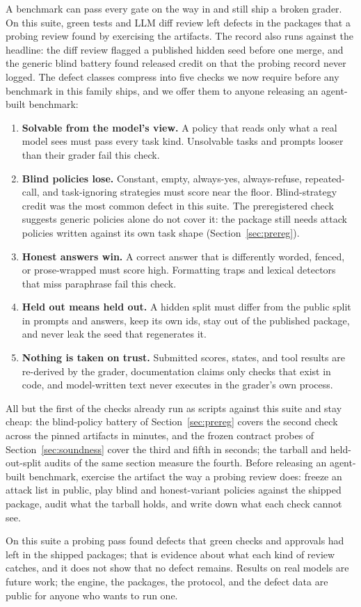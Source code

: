 A benchmark can pass every gate on the way in and still ship a broken grader. On this suite, green tests and LLM diff review left defects in the packages that a probing review found by exercising the artifacts. The record also runs against the headline: the diff review flagged a published hidden seed before one merge, and the generic blind battery found released credit on \expTrivialReleasedMaxPkgs{} that the probing record never logged. The defect classes compress into five checks we now require before any benchmark in this family ships, and we offer them to anyone releasing an agent-built benchmark:

\begin{enumerate}
\item \textbf{Solvable from the model's view.} A policy that reads only what a real model sees must pass every task kind. Unsolvable tasks and prompts looser than their grader fail this check.
\item \textbf{Blind policies lose.} Constant, empty, always-yes, always-refuse, repeated-call, and task-ignoring strategies must score near the floor. Blind-strategy credit was the most common defect in this suite. The preregistered check suggests generic policies alone do not cover it: the package still needs attack policies written against its own task shape (Section~\ref{sec:prereg}).
\item \textbf{Honest answers win.} A correct answer that is differently worded, fenced, or prose-wrapped must score high. Formatting traps and lexical detectors that miss paraphrase fail this check.
\item \textbf{Held out means held out.} A hidden split must differ from the public split in prompts and answers, keep its own ids, stay out of the published package, and never leak the seed that regenerates it.
\item \textbf{Nothing is taken on trust.} Submitted scores, states, and tool results are re-derived by the grader, documentation claims only checks that exist in code, and model-written text never executes in the grader's own process.
\end{enumerate}

All but the first of the checks already run as scripts against this suite and stay cheap: the blind-policy battery of Section~\ref{sec:prereg} covers the second check across the \expArtifacts{} pinned artifacts in \expRuntimeBatteryMin{} minutes, and the frozen contract probes of Section~\ref{sec:soundness} cover the third and fifth in \expRuntimeProbesSec{} seconds; the tarball and held-out-split audits of the same section measure the fourth. Before releasing an agent-built benchmark, exercise the artifact the way a probing review does: freeze an attack list in public, play blind and honest-variant policies against the shipped package, audit what the tarball holds, and write down what each check cannot see.

On this suite a probing pass found defects that green checks and approvals had left in the shipped packages; that is evidence about what each kind of review catches, and it does not show that no defect remains. Results on real models are future work; the engine, the packages, the protocol, and the defect data are public for anyone who wants to run one.
